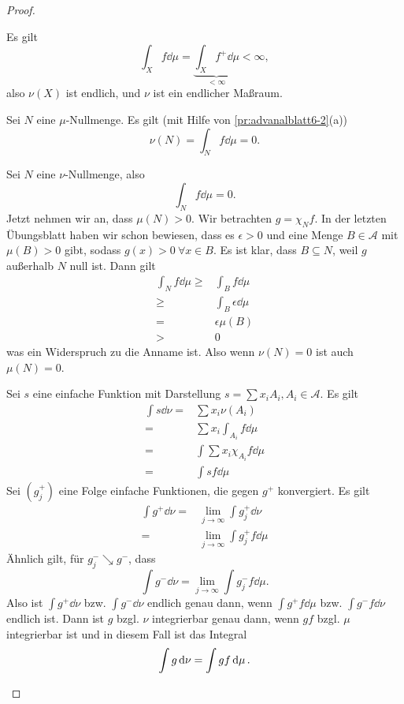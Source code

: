 \begin{proof}
\begin{parts}
\begin{enumerate}[label=(\roman*)]
			Es gilt
			\[
			\int_X f\dd{\mu}=\underbrace{\int_X f^+\dd{\mu}}_{<\infty}<\infty
			,\]
			also $\nu(X)$ ist endlich, und $\nu$ ist ein endlicher Maßraum.
		\end{enumerate}
	\item Sei $N$ eine $\mu$-Nullmenge. Es gilt (mit Hilfe von \ref{pr:advanalblatt6-2}(a)) 
		\[
			\nu(N)=\int_N f\dd{\mu}=0
		.\] 
	\item Sei $N$ eine $\nu$-Nullmenge, also
		\[
			\int_N f\dd{\mu}=0
		.\] 
		Jetzt nehmen wir an, dass $\mu(N)>0$. Wir betrachten $g=\chi_N f$. In der letzten Übungsblatt haben wir schon bewiesen, dass es $\epsilon>0$ und eine Menge $B\in\mathcal{A}$ mit $\mu(B)>0$ gibt, sodass $g(x)>0~\forall x\in B$. Es ist klar, dass $B\subseteq N$, weil $g$ außerhalb $N$ null ist. Dann gilt
		\begin{align*}
			\int_N f\dd{\mu}\ge& \int_B f\dd{\mu}\\
			\ge& \int_B \epsilon\dd{\mu}\\
			=& \epsilon\mu(B)\\
			>&0
		\end{align*}
		was ein Widerspruch zu die Anname ist. Also wenn $\nu(N)=0$ ist auch $\mu(N)=0$.
	\item Sei $s$ eine einfache Funktion mit Darstellung $s=\sum x_i A_i, A_i\in \mathcal{A}$. Es gilt
		\begin{align*}
			\int s\dd{\nu}=& \sum x_i \nu(A_i)\\
			=& \sum x_i\int_{A_i}f\dd{\mu}\\
			=&\int \sum x_i \chi_{A_i}f\dd{\mu}\\
			=&\int sf\dd{\mu}
		\end{align*}
		Sei $(g_j^+)$ eine Folge einfache Funktionen, die gegen $ g^+$ konvergiert. Es gilt
		\begin{align*}
			\int g^+\dd{\nu}=&\lim_{j \to \infty} \int g^+_j\dd{\nu}\\
			=&\lim_{j \to \infty} \int g^+_j f\dd{\mu}
		\end{align*}
		Ähnlich gilt, f\"{u}r $g_j^-\searrow g^-$, dass
		\[
			\int g^-\dd{\nu}=\lim_{j \to \infty} \int g^-_j f\dd{\mu}
		.\] 
		Also ist $\int g^+\dd{\nu}$ bzw. $\int g^- \dd{\nu}$ endlich genau dann, wenn $\int g^+f\dd{\mu}$ bzw. $\int g^- f\dd{\nu}$ endlich ist. Dann ist $g$ bzgl. $\nu$ integrierbar genau dann, wenn $gf$ bzgl. $\mu$ integrierbar ist und in diesem Fall ist das Integral
		\[
			\int g\dd{\nu}=\int gf\dd{\mu}
		.\qedhere\] 
	\end{parts}
\end{proof}
